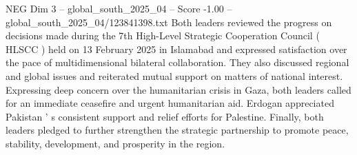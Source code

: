 \begin{textsample}{NEG Dim 3 – global\_south\_2025\_04 – Score -1.00 – global\_south\_2025\_04/123841398.txt}
Both leaders reviewed the progress on decisions made during the 7th High-Level Strategic Cooperation Council ( HLSCC ) held on 13 February 2025 in Islamabad and expressed satisfaction over the pace of multidimensional bilateral collaboration.
They also discussed regional and global issues and reiterated mutual support on matters of national interest.
Expressing deep concern over the humanitarian crisis in Gaza, both leaders called for an immediate ceasefire and urgent humanitarian aid.
Erdogan appreciated Pakistan ' s consistent support and relief efforts for Palestine.
Finally, both leaders pledged to further strengthen the strategic partnership to promote peace, stability, development, and prosperity in the region.

\end{textsample}
